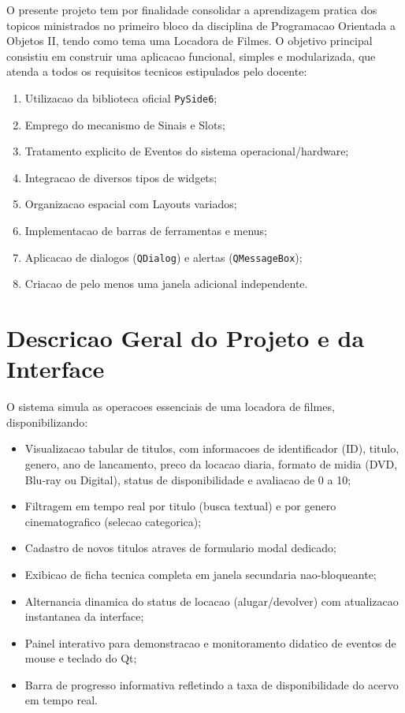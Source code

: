 ﻿\documentclass[12pt]{article}
\begin{document}
O presente projeto tem por finalidade consolidar a aprendizagem pratica dos topicos ministrados no primeiro bloco da disciplina de Programacao Orientada a Objetos II, tendo como tema uma Locadora de Filmes. O objetivo principal consistiu em construir uma aplicacao funcional, simples e modularizada, que atenda a todos os requisitos tecnicos estipulados pelo docente:
\begin{enumerate}
    \item Utilizacao da biblioteca oficial \texttt{PySide6};
    \item Emprego do mecanismo de Sinais e Slots;
    \item Tratamento explicito de Eventos do sistema operacional/hardware;
    \item Integracao de diversos tipos de widgets;
    \item Organizacao espacial com Layouts variados;
    \item Implementacao de barras de ferramentas e menus;
    \item Aplicacao de dialogos (\texttt{QDialog}) e alertas (\texttt{QMessageBox});
    \item Criacao de pelo menos uma janela adicional independente.
\end{enumerate}

\section{Descricao Geral do Projeto e da Interface}

O sistema simula as operacoes essenciais de uma locadora de filmes, disponibilizando:
\begin{itemize}
    \item Visualizacao tabular de titulos, com informacoes de identificador (ID), titulo, genero, ano de lancamento, preco da locacao diaria, formato de midia (DVD, Blu-ray ou Digital), status de disponibilidade e avaliacao de 0 a 10;
    \item Filtragem em tempo real por titulo (busca textual) e por genero cinematografico (selecao categorica);
    \item Cadastro de novos titulos atraves de formulario modal dedicado;
    \item Exibicao de ficha tecnica completa em janela secundaria nao-bloqueante;
    \item Alternancia dinamica do status de locacao (alugar/devolver) com atualizacao instantanea da interface;
    \item Painel interativo para demonstracao e monitoramento didatico de eventos de mouse e teclado do Qt;
    \item Barra de progresso informativa refletindo a taxa de disponibilidade do acervo em tempo real.
\end{itemize}
\end{document}
